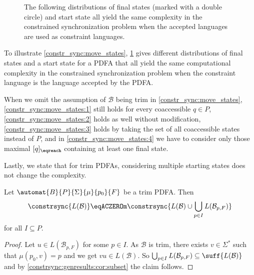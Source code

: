 \begin{figure}[htbp]
\begin{minipage}{0.2\textwidth}
	\end{minipage}\hfill
	\caption[Distributions of final states that give equivalent constrained problems]{The following distributions
		of final states (marked with a double circle) and start state
		all yield the same complexity in the constrained synchronization problem
		when the accepted languages are used as constraint languages.}
	\label{constrsync:fig:distributions-final-states}
\end{figure}	

To illustrate \cref{constr_sync:move_states}, 
\cref{constrsync:fig:distributions-final-states} gives different distributions of final states and a start state
for a PDFA that all yield the same computational complexity in the constrained synchronization problem
when the constraint language is the language accepted by the PDFA.

When we omit the assumption of $\mathcal B$ being trim
in \cref{constr_sync:move_states}, \ref{constr_sync:move_states:1} still holds
for every coaccessible $q \in P$, \ref{constr_sync:move_states:2} holds as well without modification, 
\ref{constr_sync:move_states:3} holds by taking
the set of all coaccessible states instead of $P$, and in \ref{constr_sync:move_states:4} we have to consider
only those maximal $[q]_{\eqreach}$ containing at least one final state.

Lastly, we state that for trim PDFAs, considering multiple starting
states does not change the complexity.

\begin{proposition} \label{constr_sync:prop:start_states}
	Let $\automat{B}{P}{\Sigma}{\mu}{p_0}{F}$ be a trim PDFA.	
	Then 
	\[ 
	\constrsync{L(\mathcal B)} \eqACZEROm \constrsync{L(\mathcal B) \cup \bigcup_{p \in I} L(\mathcal B_{p, F})}
	\]
	for all $I \subseteq P$.
\end{proposition}
\begin{proof}
	Let $u \in L(\mathcal B_{p, F})$ for some $p \in I$.
	As $\mathcal B$ is trim, there exists $v \in \Sigma^*$
	such that $\mu(p_0, v) = p$ and we get $vu \in L(\mathcal B)$.
	So $\bigcup_{p \in I} L(\mathcal B_{p, F}) \subseteq \suff{L(\mathcal B)}$
	and by \cref{constrsync:genresults:cor:subset} 
	the claim follows.
\end{proof}

